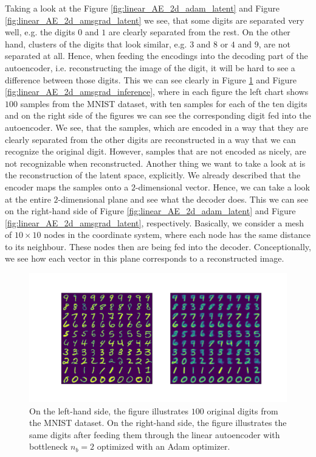 Taking a look at the Figure \ref{fig:linear_AE_2d_adam_latent} and Figure \ref{fig:linear_AE_2d_amsgrad_latent} we see, that some digits are separated very well, e.g. the digits $0$ and $1$ are clearly separated from the rest. On the other hand, clusters of the digits that look similar, e.g. $3$ and $8$ or $4$ and $9$, are not separated at all. Hence, when feeding the encodings into the decoding part of the autoencoder, i.e. reconstructing the image of the digit, it will be hard to see a difference between those digits. This we can see clearly in Figure \ref{fig:linear_AE_2d_adam_inference} and Figure \ref{fig:linear_AE_2d_amsgrad_inference}, where in each figure the left chart shows $100$ samples from the MNIST dataset, with ten samples for each of the ten digits and on the right side of the figures we can see the corresponding digit fed into the autoencoder. We see, that the samples, which are encoded in a way that they are clearly separated from the other digits are reconstructed in a way that we can recognize the original digit. However, samples that are not encoded as nicely, are not recognizable when reconstructed. Another thing we want to take a look at is the reconstruction of the latent space, explicitly. We already described that the encoder maps the samples onto a $2$-dimensional vector. Hence, we can take a look at the entire $2$-dimensional plane and see what the decoder does. This we can see on the right-hand side of Figure \ref{fig:linear_AE_2d_adam_latent} and Figure \ref{fig:linear_AE_2d_amsgrad_latent}, respectively. Basically, we consider a mesh of $10\times 10$ nodes in the coordinate system, where each node has the same distance to its neighbour. These nodes then are being fed into the decoder. Conceptionally, we see how each vector in this plane corresponds to a reconstructed image.


\begin{figure}
\begin{center}
   \begin{minipage}[b]{\linewidth}
      \includegraphics[trim = 15mm 10mm 15mm 15mm, clip, width=\linewidth]{linear_AE_2d_adam_inference}
	\end{minipage}
\end{center}
\caption{On the left-hand side, the figure illustrates $100$ original digits from the MNIST dataset. On the right-hand side, the figure illustrates the same digits after feeding them through the linear autoencoder with bottleneck $n_b=2$ optimized with an Adam optimizer.}\label{fig:linear_AE_2d_adam_inference}
\end{figure}


